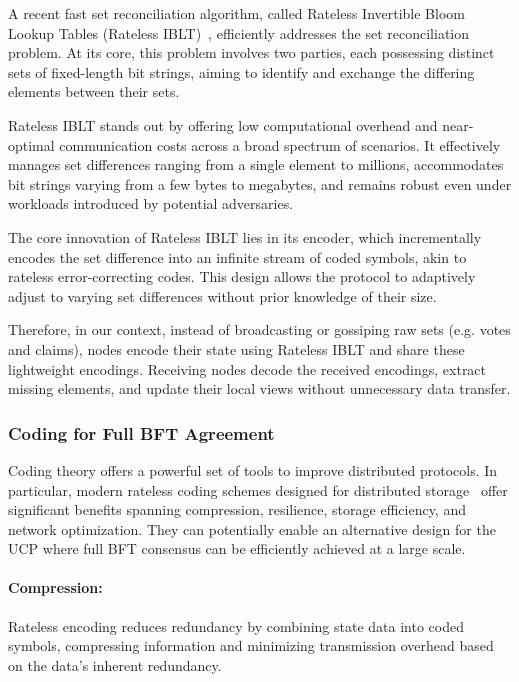\documentclass{article}
\newcommand{\UC}{UCP}
\begin{document}
A recent fast set reconciliation algorithm, called Rateless Invertible Bloom Lookup Tables (Rateless IBLT)~\cite{YangYGA:2024}, efficiently addresses the set reconciliation problem. At its core, this problem involves two parties, each possessing distinct sets of fixed-length bit strings, aiming to identify and exchange the differing elements between their sets.

Rateless IBLT stands out by offering low computational overhead and near-optimal communication costs across a broad spectrum of scenarios. It effectively manages set differences ranging from a single element to millions, accommodates bit strings varying from a few bytes to megabytes, and remains robust even under workloads introduced by potential adversaries.

The core innovation of Rateless IBLT lies in its encoder, which incrementally encodes the set difference into an infinite stream of coded symbols, akin to rateless error-correcting codes. This design allows the protocol to adaptively adjust to varying set differences without prior knowledge of their size.

Therefore, in our context, instead of broadcasting or gossiping raw sets (e.g. votes and claims), nodes encode their state using Rateless IBLT and share these lightweight encodings. Receiving nodes decode the received encodings, extract missing elements, and update their local views without unnecessary data transfer.

\subsubsection{Coding for Full BFT Agreement} 

Coding theory offers a powerful set of tools to improve distributed protocols. In particular, modern rateless coding schemes designed for distributed storage~\cite{RawatRVBS:2011,NicolaouNCPTKML:2022} offer significant benefits spanning compression, resilience, storage efficiency, and network optimization. They can potentially enable an alternative design for the \UC{} where full BFT consensus can be efficiently achieved at a large scale. 

\paragraph{Compression:} 
Rateless encoding reduces redundancy by combining state data into coded symbols, compressing information and minimizing transmission overhead based on the data’s inherent redundancy.
\end{document}
